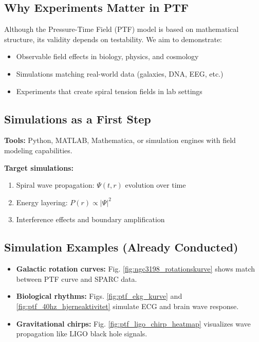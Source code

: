 \documentclass[a4paper,12pt]{article}
\begin{document}
\subsection{Why Experiments Matter in PTF}

Although the Pressure-Time Field (PTF) model is based on mathematical structure, its validity depends on testability. We aim to demonstrate:
\begin{itemize}
    \item Observable field effects in biology, physics, and cosmology
    \item Simulations matching real-world data (galaxies, DNA, EEG, etc.)
    \item Experiments that create spiral tension fields in lab settings
\end{itemize}

\subsection{Simulations as a First Step}

\textbf{Tools:}  
Python, MATLAB, Mathematica, or simulation engines with field modeling capabilities.

\textbf{Target simulations:}
\begin{enumerate}
    \item Spiral wave propagation: $\Psi(t, r)$ evolution over time
    \item Energy layering: $P(r) \propto |\Psi|^2$
    \item Interference effects and boundary amplification
\end{enumerate}

\subsection{Simulation Examples (Already Conducted)}

\begin{itemize}
    \item \textbf{Galactic rotation curves:}  
    Fig. \ref{fig:ngc3198_rotationskurve} shows match between PTF curve and SPARC data.
    
    \item \textbf{Biological rhythms:}  
    Figs. \ref{fig:ptf_ekg_kurve} and \ref{fig:ptf_40hz_hjerneaktivitet} simulate ECG and brain wave response.

    \item \textbf{Gravitational chirps:}  
    Fig. \ref{fig:ptf_ligo_chirp_heatmap} visualizes wave propagation like LIGO black hole signals.
\end{itemize}
\end{document}
